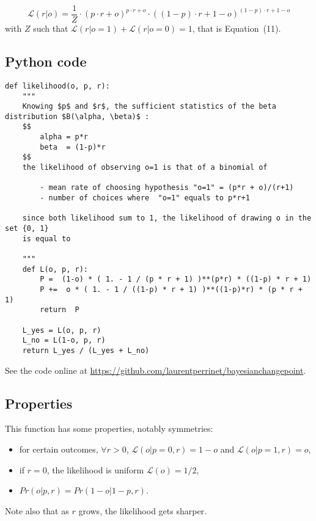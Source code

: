 \documentclass[10pt,letterpaper]{article}
\newcommand{\eql}[1]{\begin{equation}#1\end{equation}}
\newcommand{\Ll}{\mathcal{L}}
\newcommand{\seeEq}[1]{Equation~\ref{eq:#1}}
\newcommand{\seeApp}[1]{Appendix~\ref{app:#1}}
\begin{document}
\eql{
\Ll(r | o) = \frac{1}{Z} \cdot {(p \cdot r + o)}^{p \cdot r + o} \cdot {((1- p)\cdot r + 1- o)}^{(1- p)\cdot r + 1- o}
}
with $Z$ such that $\Ll(r | o=1) + \Ll(r | o=0)=1$, that is Equation~(11). %

\subsection{Python code}

\begin{lstlisting}
def likelihood(o, p, r):
    """
    Knowing $p$ and $r$, the sufficient statistics of the beta distribution $B(\alpha, \beta)$ :
    $$
        alpha = p*r
        beta  = (1-p)*r
    $$
    the likelihood of observing o=1 is that of a binomial of

        - mean rate of choosing hypothesis "o=1" = (p*r + o)/(r+1)
        - number of choices where  "o=1" equals to p*r+1

    since both likelihood sum to 1, the likelihood of drawing o in the set {0, 1}
    is equal to

    """
    def L(o, p, r):
        P =  (1-o) * ( 1. - 1 / (p * r + 1) )**(p*r) * ((1-p) * r + 1)
        P +=  o * ( 1. - 1 / ((1-p) * r + 1) )**((1-p)*r) * (p * r + 1)
        return  P

    L_yes = L(o, p, r)
    L_no = L(1-o, p, r)
    return L_yes / (L_yes + L_no)

\end{lstlisting}

See the code 
online at \url{https://github.com/laurentperrinet/bayesianchangepoint}.
\subsection{Properties}
This function has some properties, notably symmetries:
	\begin{itemize}
		\item for certain outcomes, $\forall r >0$, $\Ll(o|p=0, r)=1-o$ and $\Ll(o|p=1, r)=o$,
		\item if $r=0$, the likelihood is uniform $\Ll(o)=1/2$,
		\item $Pr(o | p, r)=Pr(1-o | 1-p, r)$.
	\end{itemize}

\noindent Note also that as $r$ grows, the likelihood gets sharper.




\end{document}
